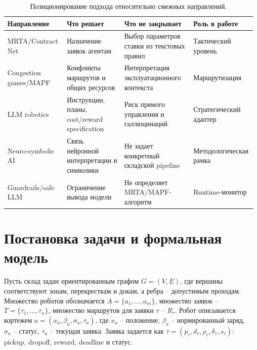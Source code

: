 \documentclass[runningheads]{llncs}
\begin{document}
\begin{table}[!htbp]
\centering
\caption{Позиционирование подхода относительно смежных направлений.}
\label{tab:related}
\scriptsize
\begin{tabular}{p{}p{}p{}p{}}
\toprule
Направление & Что решает & Что не закрывает & Роль в работе \\
\midrule
MRTA/Contract Net & Назначение заявок агентам & Выбор параметров ставки из текстовых правил & Тактический уровень \\
Congestion games/MAPF & Конфликты маршрутов и общих ресурсов & Интерпретация эксплуатационного контекста & Маршрутизация \\
LLM robotics & Инструкции, планы, cost/reward specification & Риск прямого управления и галлюцинаций & Стратегический адаптер \\
Neuro-symbolic AI & Связь нейронной интерпретации и символики & Не задает конкретный складской pipeline & Методологическая рамка \\
Guardrails/safe LLM & Ограничение вывода модели & Не определяет MRTA/MAPF-алгоритм & Runtime-монитор \\
\bottomrule
\end{tabular}
\end{table}

\section{Постановка задачи и формальная модель}

Пусть склад задан ориентированным графом $G=(V,E)$, где вершины соответствуют зонам, перекресткам и докам, а ребра -- допустимым проходам. Множество роботов обозначается $A=\{a_1,\ldots,a_m\}$, множество заявок -- $T=\{\tau_1,\ldots,\tau_n\}$, множество маршрутов для заявки $\tau$ -- $R_\tau$. Робот описывается кортежем $a=(x_a,\beta_a,\sigma_a,\tau_a)$, где $x_a$ -- положение, $\beta_a$ -- нормированный заряд, $\sigma_a$ -- статус, $\tau_a$ -- текущая заявка. Заявка задается как $\tau=(p_\tau,d_\tau,\rho_\tau,\delta_\tau,s_\tau)$: pickup, dropoff, reward, deadline и статус.
\end{document}
